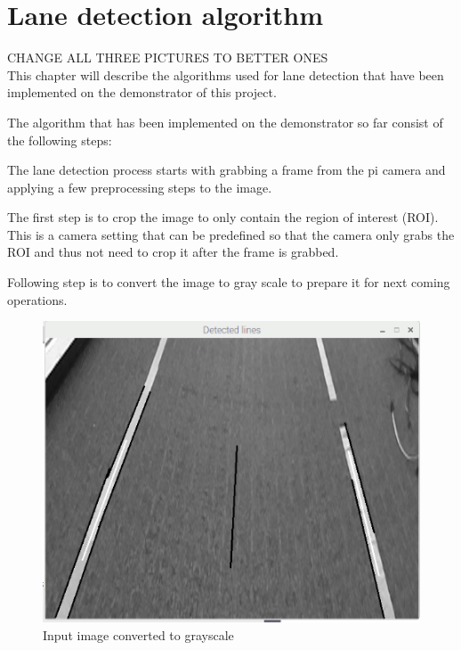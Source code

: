 

\section{Lane detection algorithm}
CHANGE ALL THREE PICTURES TO BETTER ONES\\

This chapter will describe the algorithms used for lane detection that have been implemented on the demonstrator of this project. 

The algorithm that has been implemented on the demonstrator so far consist of the following steps:

The lane detection process starts with grabbing a frame from the pi camera and applying a few preprocessing steps to the image. 

The first step is to crop the image to only contain the region of interest (ROI). This is a camera setting that can be predefined so that the camera only grabs the ROI and thus not need to crop it after the frame is grabbed.


Following step is to convert the image to gray scale to prepare it for next coming operations. 



\begin{figure}[H]
  \includegraphics[scale=0.7]{./img/gray.png}
  \centering
  \caption{Input image converted to grayscale}
  \label{fig:Input image converted to grayscale}
\end{figure}


